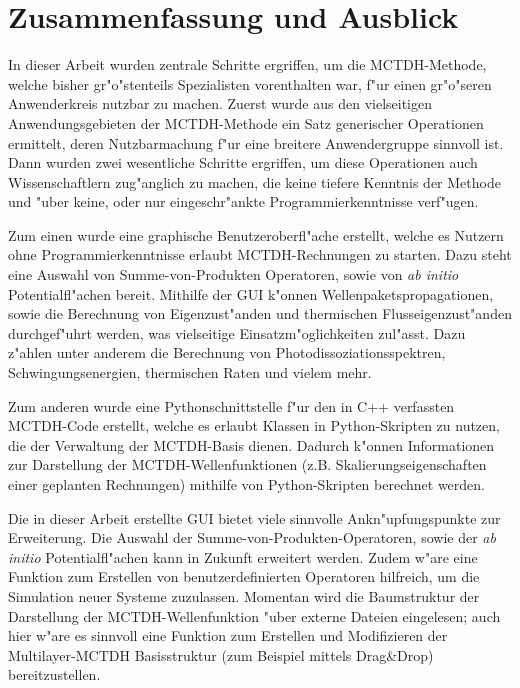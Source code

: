 \chapter{Zusammenfassung und Ausblick}
\label{cha:fazit}

In dieser Arbeit wurden zentrale Schritte ergriffen, um die MCTDH-Methode, welche bisher gr"o"stenteils
Spezialisten vorenthalten war, f"ur einen gr"o"seren Anwenderkreis nutz\-bar zu machen.
Zuerst wurde aus den vielseitigen Anwendungsgebieten der MCTDH-Methode ein Satz generischer
Operationen ermittelt, deren Nutzbarmachung f"ur eine breitere Anwendergruppe sinnvoll ist.
Dann wurden zwei wesentliche Schritte ergriffen, um diese Operationen auch
Wissenschaftlern zug"anglich zu machen, die keine tiefere Kenntnis der Methode und
"uber keine, oder nur eingeschr"ankte Programmierkenntnisse verf"ugen.

Zum einen wurde eine graphische Benutzeroberfl"ache erstellt, welche es Nutzern ohne
Programmierkenntnisse erlaubt MCTDH-Rechnungen zu starten. Dazu steht eine Aus\-wahl
von Summe-von-Produkten Operatoren, sowie von \textit{ab initio} Potentialfl"achen bereit.
Mithilfe der GUI k"onnen Wellenpaketspropagationen, sowie die Berechnung von Eigenzust"anden
und thermischen Flusseigenzust"anden durchgef"uhrt werden, was vielseitige Einsatzm"oglichkeiten
zul"asst. Dazu z"ahlen unter anderem die Berechnung von Photodissoziationsspektren, 
Schwingungsenergien, thermischen Raten und vielem mehr.

Zum anderen wurde eine Pythonschnittstelle f"ur den in C++ verfassten MCTDH-Code erstellt, 
welche es erlaubt Klassen in Python-Skripten zu nutzen, die der Verwaltung der MCTDH-Basis dienen. 
Dadurch k"onnen Informationen zur Darstellung der MCTDH-Wellenfunktionen (z.B. Skalierungseigenschaften
einer geplanten Rechnungen) mithilfe von Python-Skripten berechnet werden.

Die in dieser Arbeit erstellte GUI bietet viele sinnvolle Ankn"upfungspunkte zur Erweiterung.
Die Auswahl der Summe-von-Produkten-Operatoren, sowie der \textit{ab initio} Potentialfl"achen kann in Zukunft
erweitert werden. Zudem w"are eine Funktion zum Erstellen von benutzerdefinierten Operatoren
hilfreich, um die Simulation neuer Systeme zuzulassen. Momentan wird die Baumstruktur der Darstellung der MCTDH-Wellenfunk\-tion
"uber externe Dateien eingelesen; auch hier w"are es sinnvoll eine Funktion zum
Erstellen und Modifizieren der Multilayer-MCTDH Basisstruktur (zum Beispiel mit\-tels Drag\&Drop) bereitzustellen.

